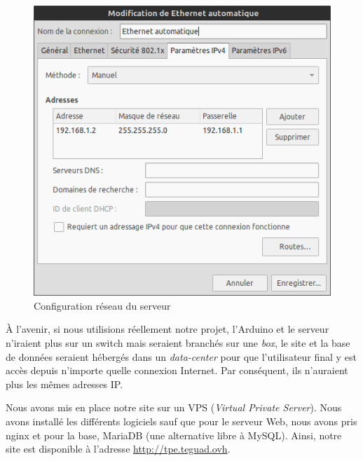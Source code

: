 \begin{figure}[!h]
	\centering
	\includegraphics[width=.5\linewidth]{Images/Parametres_reseau_Linux}
	\caption{Configuration réseau du serveur}
	\label{fig:configuration-reseau}
\end{figure}

\Espace

À l'avenir, si nous utilisions réellement notre projet, l'Arduino et le serveur n'iraient plus sur un switch mais seraient branchés sur une \emph{box}, le site et la base de données seraient hébergés dans un \emph{data-center} pour que l'utilisateur final y est accès depuis n'importe quelle connexion Internet. Par conséquent, ils n'auraient plus les mêmes adresses IP.

Nous avons mis en place notre site sur un VPS (\emph{Virtual Private Server}). Nous avons installé les différents logiciels sauf que pour le serveur Web, nous avons pris nginx et pour la base, MariaDB (une alternative libre à MySQL). Ainsi, notre site est disponible à l'adresse \url{http://tpe.teguad.ovh}.
